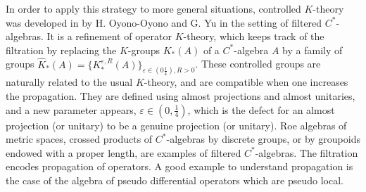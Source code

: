 In order to apply this strategy to more general situations, controlled $K$-theory was developed in \cite{OY2} by H. Oyono-Oyono and G. Yu in the setting of filtered $C^*$-algebras. It is a refinement of operator $K$-theory, which keeps track of the filtration by replacing the $K$-groups $K_*(A)$ of a $C^*$-algebra $A$ by a family of groups $\hat K_*(A)= \{K_*^{\varepsilon,R}(A)\}_{\varepsilon\in (0\frac{1}{4}),R>0}$. These controlled groups are naturally related to the usual $K$-theory, and are compatible when one increases the propagation. They are defined using almost projections and almost unitaries, and a new parameter appears, $\varepsilon\in (0 , \frac{1}{4})$, which is the defect for an almost projection (or unitary) to be a genuine projection (or unitary). Roe algebras of metric spaces, crossed products of $C^*$-algebras by discrete groups, or by groupoids endowed with a proper length, are examples of filtered $C^*$-algebras. The filtration encodes propagation of operators. A good example to understand propagation is the case of the algebra of pseudo differential operators which are pseudo local.\\%



